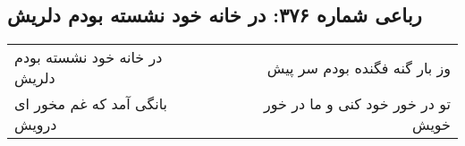 \begin{center}
\section*{رباعی شماره ۳۷۶: در خانه خود نشسته بودم دلریش}
\label{sec:sh376}
\begin{longtable}{l p{0.5cm} r}
در خانه خود نشسته بودم دلریش
&&
وز بار گنه فگنده بودم سر پیش
\\
بانگی آمد که غم مخور ای درویش
&&
تو در خور خود کنی و ما در خور خویش
\\
\end{longtable}
\end{center}
